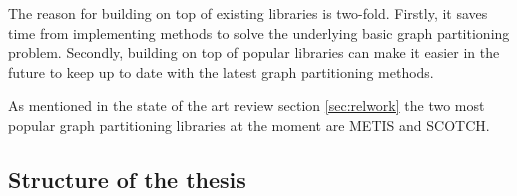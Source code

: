 The reason for building on top of existing libraries is two-fold.
Firstly, it saves time from implementing methods to solve the underlying basic graph partitioning problem.
Secondly, building on top of popular libraries can make it easier in the future to keep up to date with the latest graph partitioning methods.

As mentioned in the state of the art review section \ref{sec:relwork} the two most popular graph partitioning libraries at the moment are METIS and SCOTCH.

\subsection{Structure of the thesis}
